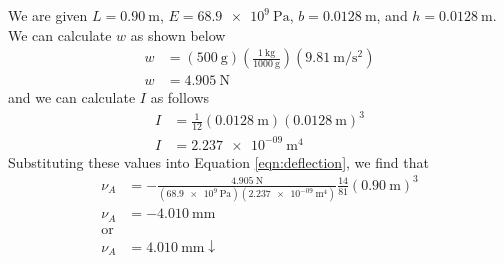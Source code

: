\documentclass[12 pt]{article}
\begin{document}
\begin{enumerate}[label=(\Alph*)]
	We are given $L=\qty{0.90}{\m}$, $E=\qty{68.9e9}{\Pa}$, $b=\qty{0.0128}{\m}$, and $h=\qty{0.0128}{\m}$. We can calculate $w$ as shown below
	\begin{align*}
		w&=(\qty{500}{\g})\left(\frac{\qty{1}{\kg}}{\qty{1000}{\g}}\right)\left(\qty[per-mode=fraction]{9.81}{\m\per\s\squared}\right)\\
		w&=\qty{4.905}{\N}
	\end{align*}
	and we can calculate $I$ as follows
	\begin{align*}
		I&=\frac{1}{12}(\qty{0.0128}{\m})(\qty{0.0128}{\m})^3\\
		I&=\qty{2.237e-09}{\m^4}
	\end{align*}
	Substituting these values into Equation \ref{eqn:deflection}, we find that
	\begin{align*}
		\nu_A&=-\frac{\qty{4.905}{\N}}{(\qty{68.9e9}{\Pa})(\qty{2.237e-09}{\m^4})}\frac{14}{81}(\qty{0.90}{\m})^3\\
		\nu_A&=\qty{-4.010}{\mm}\\
		\text{or}\\
		\nu_A&=\qty{4.010}{\mm}\downarrow
	\end{align*}
\end{enumerate}
\end{document}
